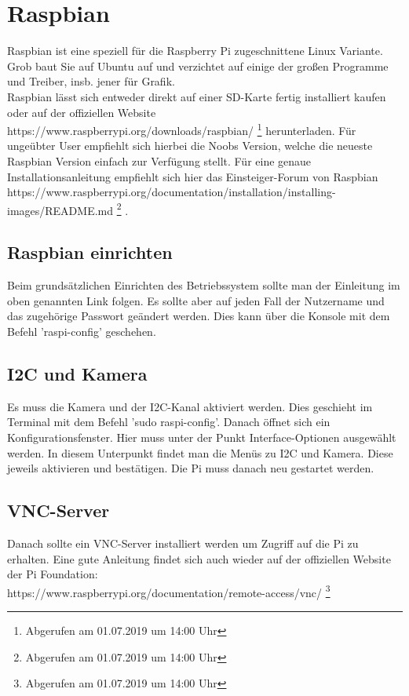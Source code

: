 \documentclass[twoside,12pt,a4paper]{report}
\begin{document}
	\section{Raspbian}
	Raspbian ist eine speziell für die Raspberry Pi zugeschnittene Linux Variante. Grob baut Sie auf Ubuntu auf und verzichtet auf einige der großen Programme und Treiber, insb. jener für Grafik. \\
	Raspbian lässt sich entweder direkt auf einer SD-Karte fertig installiert kaufen oder auf der offiziellen Website\\ https://www.raspberrypi.org/downloads/raspbian/ \footnote{Abgerufen am 01.07.2019 um 14:00 Uhr}
	herunterladen. Für ungeübter User empfiehlt sich hierbei die Noobs Version, welche die neueste Raspbian Version einfach zur Verfügung stellt. Für eine genaue Installationsanleitung empfiehlt sich hier das Einsteiger-Forum von Raspbian https://www.raspberrypi.org/documentation/installation/installing-images/README.md \footnote{Abgerufen am 01.07.2019 um 14:00 Uhr}
	.
	
	\subsection{Raspbian einrichten}
	Beim grundsätzlichen Einrichten des Betriebssystem sollte man der Einleitung im oben genannten Link folgen. Es sollte aber auf jeden Fall der Nutzername und das zugehörige Passwort geändert werden. Dies kann über die Konsole mit dem Befehl 'raspi-config' geschehen. \\
	
	\subsection{I2C und Kamera}
	Es muss die Kamera und der I2C-Kanal aktiviert werden. Dies geschieht im Terminal mit dem Befehl 'sudo raspi-config'. Danach öffnet sich ein Konfigurationsfenster. Hier muss unter der Punkt Interface-Optionen ausgewählt werden. In diesem Unterpunkt findet man die Menüs zu I2C und Kamera. Diese jeweils aktivieren und bestätigen. Die Pi muss danach neu gestartet werden. 
	
	\subsection{VNC-Server}
	Danach sollte ein VNC-Server installiert werden um Zugriff auf die Pi zu erhalten. Eine gute Anleitung findet sich auch wieder auf der offiziellen Website der Pi Foundation:\\
	https://www.raspberrypi.org/documentation/remote-access/vnc/ \footnote{Abgerufen am 01.07.2019 um 14:00 Uhr}
	
\end{document}

